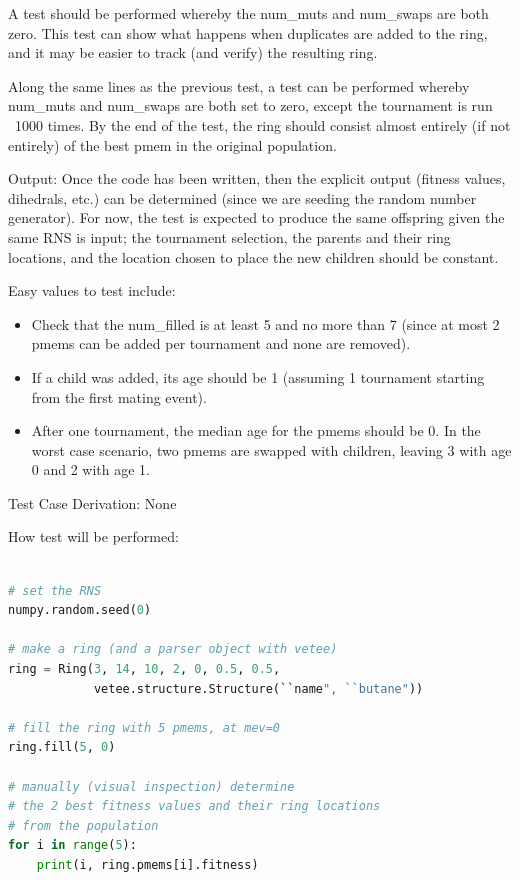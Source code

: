 \documentclass[12pt, titlepage]{article}
\begin{document}
\begin{enumerate}
A test should be performed whereby the num\_muts and num\_swaps are both zero. 
This test can show what happens when duplicates are added to the ring, and it 
may be easier to track (and verify) the resulting ring.

Along the same lines as the previous test, a test can be performed whereby 
num\_muts and num\_swaps are both set to zero, except the tournament is run 
~1000 times. By the end of the test, the ring should consist almost entirely 
(if not entirely) of the best pmem in the original population.

Output: Once the code has been written, then the explicit output (fitness 
values, dihedrals, etc.) can be determined (since we are seeding the random 
number generator). For now, the test is expected to produce the same offspring 
given the same RNS is input; the tournament selection, the parents and their 
ring locations, and the location chosen to place the new children should 
be constant.

Easy values to test include:
\begin{itemize}
	\item Check that the num\_filled is at least 5 and no more than 7 (since at 
	most 2 pmems can be added per tournament and none are removed).
	\item If a child was added, its age should be 1 (assuming 1 tournament 
	starting from the first mating event).
	\item After one tournament, the median age for the pmems should be 0. In 
	the worst case scenario, two pmems are swapped with children, leaving 3 
	with age 0 and 2 with age 1.
\end{itemize}

Test Case Derivation: None

How test will be performed:

\begin{lstlisting}[language=python, showstringspaces=false]

# set the RNS
numpy.random.seed(0)

# make a ring (and a parser object with vetee)
ring = Ring(3, 14, 10, 2, 0, 0.5, 0.5, 
            vetee.structure.Structure(``name", ``butane"))

# fill the ring with 5 pmems, at mev=0
ring.fill(5, 0)

# manually (visual inspection) determine
# the 2 best fitness values and their ring locations
# from the population
for i in range(5):
	print(i, ring.pmems[i].fitness)


\end{lstlisting}
\end{enumerate}
\end{document}

